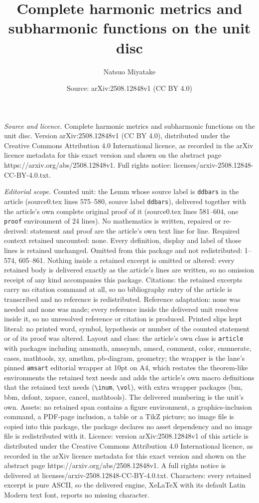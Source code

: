 \documentclass[10pt,a4paper]{amsart}
\title[Complete harmonic metrics and subharmonic functions on the u]{Complete harmonic metrics and subharmonic functions on the unit disc}
\author{Natsuo Miyatake}
\date{Source: arXiv:2508.12848v1 (CC BY 4.0)}
\begin{document}
\maketitle

\noindent\emph{Source and licence.} Complete harmonic metrics and subharmonic functions on the unit disc. Version arXiv:2508.12848v1 (CC BY 4.0), distributed under the Creative Commons Attribution 4.0 International licence, as recorded in the arXiv licence metadata for this exact version and shown on the abstract page https://arxiv.org/abs/2508.12848v1. Full rights notice: licenses/arxiv-2508.12848-CC-BY-4.0.txt.\par\smallskip

\noindent\textit{Editorial scope.} Counted unit: the Lemm whose source label is \texttt{ddbars} in the article (source0.tex lines 575--580, source label \texttt{ddbars}), delivered together with the article's own complete original proof of it (source0.tex lines 581--604, one \texttt{proof} environment of 24 lines). No mathematics is written, repaired or re-derived: statement and proof are the article's own text line for line. Required context retained uncounted: none. Every definition, display and label of those lines is retained unchanged. Omitted from this package and not redistributed: 1--574, 605--861. Nothing inside a retained excerpt is omitted or altered: every retained body is delivered exactly as the article's lines are written, so no omission receipt of any kind accompanies this package. Citations: the retained excerpts carry no citation command at all, so no bibliography entry of the article is transcribed and no reference is redistributed. Reference adaptation: none was needed and none was made; every reference inside the delivered unit resolves inside it, so no unresolved reference or citation is produced. Printed slips kept literal: no printed word, symbol, hypothesis or number of the counted statement or of its proof was altered. Layout and class: the article's own class is \texttt{article} with packages including amsmath, amssymb, amscd, comment, color, enumerate, cases, mathtools, xy, amsthm, pb-diagram, geometry; the wrapper is the lane's pinned \texttt{amsart} editorial wrapper at 10pt on A4, which restates the theorem-like environments the retained text needs and adds the article's own macro definitions that the retained text needs (\texttt{\textbackslash inum}, \texttt{\textbackslash vol}), with extra wrapper packages (bm, bbm, dsfont, xspace, cancel, mathtools). The delivered numbering is the unit's own. Assets: no retained span contains a figure environment, a graphics-inclusion command, a PDF-page inclusion, a table or a TikZ picture; no image file is copied into this package, the package declares no asset dependency and no image file is redistributed with it. Licence: version arXiv:2508.12848v1 of this article is distributed under the Creative Commons Attribution 4.0 International licence, as recorded in the arXiv licence metadata for this exact version and shown on the abstract page https://arxiv.org/abs/2508.12848v1. A full rights notice is delivered at licenses/arxiv-2508.12848-CC-BY-4.0.txt. Characters: every retained excerpt is pure ASCII, so the delivered engine, XeLaTeX with its default Latin Modern text font, reports no missing character.
\end{document}
